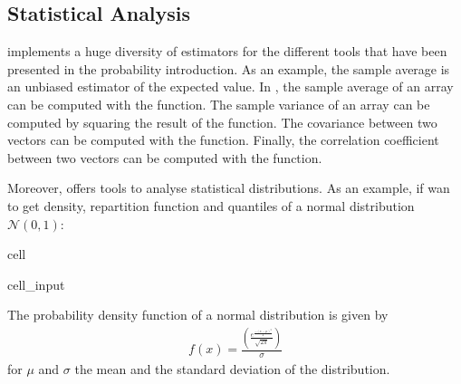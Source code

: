 \documentclass[letterpaper,10pt,english]{jupyterBook}
\begin{document}
\subsection{Statistical Analysis}
\label{\detokenize{01:statistical-analysis}}
\sphinxAtStartPar
{} implements a huge diversity of estimators for the different tools that have been presented in the probability introduction. As an example, the sample average is an unbiased estimator of the expected value. In , the sample average of an array can be computed with the  function. The sample variance of an array can be computed by squaring the result of the  function. The covariance between two vectors can be computed with the  function. Finally, the correlation coefficient between two vectors can be computed with the  function.

\sphinxAtStartPar
Moreover,  offers tools to analyse statistical distributions. As an example, if wan to get density, repartition function and quantiles of a normal distribution \(\mathcal{N}(0, 1)\):

\begin{sphinxuseclass}{cell}\begin{sphinxVerbatimInput}

\begin{sphinxuseclass}{cell_input}
\begin{sphinxVerbatim}[commandchars=\\\{\}]
\end{sphinxVerbatim}

\end{sphinxuseclass}\end{sphinxVerbatimInput}

\end{sphinxuseclass}
\sphinxAtStartPar
The probability density function of a normal distribution is given by
\begin{equation*}
\begin{split}f(x) = \frac{(\frac{e^{\frac{-(x-\mu)^2}{2}}}{\sqrt{2\pi}})}{\sigma}\end{split}
\end{equation*}
\sphinxAtStartPar
for \(\mu\) and \(\sigma\) the mean and the standard deviation of the distribution.
\end{document}
